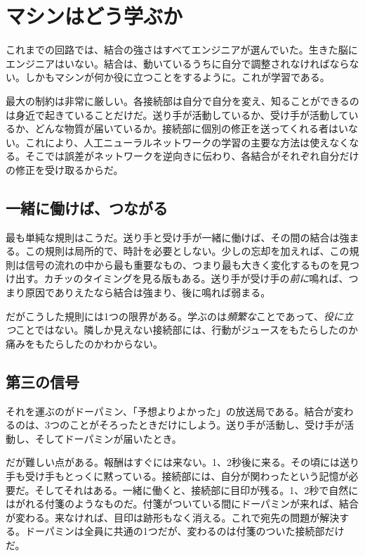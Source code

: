 \chapter{マシンはどう学ぶか}

これまでの回路では、結合の強さはすべてエンジニアが選んでいた。生きた脳にエンジニアはいない。結合は、動いているうちに自分で調整されなければならない。しかもマシンが何か役に立つことをするように。これが学習である。

最大の制約は非常に厳しい。各接続部は自分で自分を変え、知ることができるのは身近で起きていることだけだ。送り手が活動しているか、受け手が活動しているか、どんな物質が届いているか。接続部に個別の修正を送ってくれる者はいない。これにより、人工ニューラルネットワークの学習の主要な方法は使えなくなる。そこでは誤差がネットワークを逆向きに伝わり、各結合がそれぞれ自分だけの修正を受け取るからだ。

\section*{一緒に働けば、つながる}

最も単純な規則はこうだ。送り手と受け手が一緒に働けば、その間の結合は強まる。この規則は局所的で、時計を必要としない。少しの忘却を加えれば、この規則は信号の流れの中から最も重要なもの、つまり最も大きく変化するものを見つけ出す。カチッのタイミングを見る版もある。送り手が受け手の\emph{前に}鳴れば、つまり原因でありえたなら結合は強まり、後に鳴れば弱まる。

だがこうした規則には1つの限界がある。学ぶのは\emph{頻繁な}ことであって、\emph{役に立つ}ことではない。隣しか見えない接続部には、行動がジュースをもたらしたのか痛みをもたらしたのかわからない。

\section*{第三の信号}

それを運ぶのがドーパミン、「予想よりよかった」の放送局である。結合が変わるのは、3つのことがそろったときだけにしよう。送り手が活動し、受け手が活動し、そしてドーパミンが届いたとき。


だが難しい点がある。報酬はすぐには来ない。1、2秒後に来る。その頃には送り手も受け手もとっくに黙っている。接続部には、自分が関わったという記憶が必要だ。そしてそれはある。一緒に働くと、接続部に目印が残る。1、2秒で自然にはがれる付箋のようなものだ。付箋がついている間にドーパミンが来れば、結合が変わる。来なければ、目印は跡形もなく消える。これで宛先の問題が解決する。ドーパミンは全員に共通の1つだが、変わるのは付箋のついた接続部だけだ。

